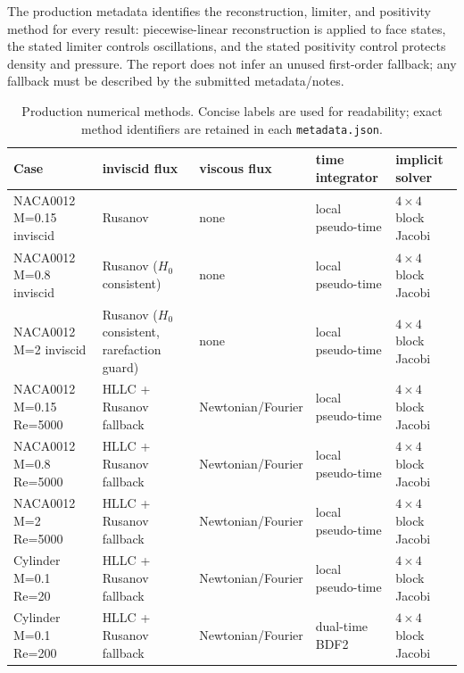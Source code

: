 \documentclass[11pt]{article}
\begin{document}
The production metadata identifies the reconstruction, limiter, and positivity method for every result: piecewise-linear reconstruction is applied to face states, the stated limiter controls oscillations, and the stated positivity control protects density and pressure.  The report does not infer an unused first-order fallback; any fallback must be described by the submitted metadata/notes.
\begin{table}[htbp]\centering\scriptsize
\caption{Production numerical methods. Concise labels are used for readability; exact method identifiers are retained in each \texttt{metadata.json}.}\label{tab:methods}
\begin{tabularx}{\linewidth}{@{}lXXXX@{}}\toprule
Case & inviscid flux & viscous flux & time integrator & implicit solver\\\midrule
NACA0012 M=0.15 inviscid & Rusanov & none & local pseudo-time & $4\times4$ block Jacobi \\
NACA0012 M=0.8 inviscid & Rusanov ($H_0$ consistent) & none & local pseudo-time & $4\times4$ block Jacobi \\
NACA0012 M=2 inviscid & Rusanov ($H_0$ consistent, rarefaction guard) & none & local pseudo-time & $4\times4$ block Jacobi \\
NACA0012 M=0.15 Re=5000 & HLLC + Rusanov fallback & Newtonian/Fourier & local pseudo-time & $4\times4$ block Jacobi \\
NACA0012 M=0.8 Re=5000 & HLLC + Rusanov fallback & Newtonian/Fourier & local pseudo-time & $4\times4$ block Jacobi \\
NACA0012 M=2 Re=5000 & HLLC + Rusanov fallback & Newtonian/Fourier & local pseudo-time & $4\times4$ block Jacobi \\
Cylinder M=0.1 Re=20 & HLLC + Rusanov fallback & Newtonian/Fourier & local pseudo-time & $4\times4$ block Jacobi \\
Cylinder M=0.1 Re=200 & HLLC + Rusanov fallback & Newtonian/Fourier & dual-time BDF2 & $4\times4$ block Jacobi \\
\bottomrule\end{tabularx}
\end{table}
\end{document}
